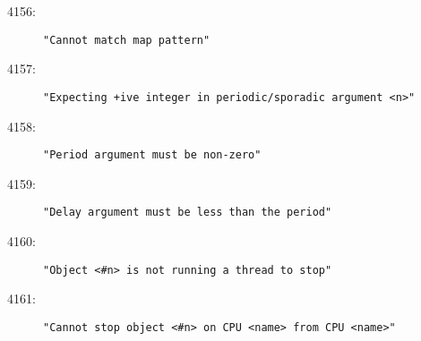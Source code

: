 \begin{description}
\item[4156:] \texttt{"Cannot match map pattern"}
\item[4157:] \texttt{"Expecting +ive integer in periodic/sporadic argument <n>"}
\item[4158:] \texttt{"Period argument must be non-zero"}
\item[4159:] \texttt{"Delay argument must be less than the period"}
\item[4160:] \texttt{"Object <#n> is not running a thread to stop"}
\item[4161:] \texttt{"Cannot stop object <#n> on CPU <name> from CPU <name>"}

\end{description}
